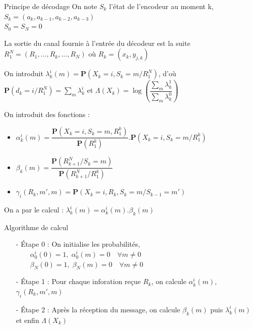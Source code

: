 \documentclass[11pt]{beamer}
\begin{document}
\begin{frame}{Principe de d\'ecodage}
	On note $S_k$ l'\'etat de l'encodeur au moment k, $S_k = (a_k, a_{k-1}, a_{k-2}, a_{k-3})$ \\
	$S_0 = S_N = 0$ \\ \smallskip

	La sortie du canal fournie \`a l'entr\'ee du d\'ecodeur est la suite $R_1^N = (R_1,\ldots,R_k,\ldots,R_N)$
	o\`u $R_k = (x_k,y_{j,k})$ \\ \smallskip
	
	On introduit $\lambda_k^i(m) = \mathbf{P}(X_k = i, S_k = m / R_1^N)$, d'o\`u $\mathbf{P}(d_k = i / R_1^N) = \sum\limits_{m} \lambda_k^i$ et $\Lambda(X_k) = \log\left(\dfrac{\sum\limits_{m} \lambda_k^1}{\sum\limits_{m} \lambda_k^0}\right) $
\end{frame}

\begin{frame}
	On introduit des fonctions :
	\begin{itemize}
		\item $\alpha_k^i(m) = \dfrac{\mathbf{P}(X_k = i, S_k = m, R_1^k)}{\mathbf{P}(R_1^k)}.\mathbf{P}(X_k = i, S_k = m / R_1^k)$
		\item $\beta_k(m) = \dfrac{\mathbf{P}(R_{k+1}^N / S_k = m)}{\mathbf{P}(R_{k+1}^N / R_1^k)}$
		\item $\gamma_i(R_k, m', m) = \mathbf{P}(X_k = i, R_k, S_k = m/ S_{k-1} = m')$
	\end{itemize}
	On a par le calcul : $\lambda_k^i(m) = \alpha_k^i(m).\beta_k(m)$
\end{frame}

\begin{frame}{Algorithme de calcul}
	\begin{itemize}
		\item[-] \'Etape 0 : On initialise les probabilit\'es, \\
					$\qquad \alpha_0^i(0) = 1, \; \alpha_0^i(m) = 0 \quad \forall m \neq 0$\\
					$\qquad \beta_N(0) = 1, \; \beta_N(m) = 0 \quad \forall m \neq 0$
		\item[-] \'Etape 1 : Pour chaque inforation re\c{c}ue $R_k$, on calcule $\alpha_k^i(m)$, $\gamma_i(R_k, m', m)$
		\item[-] \'Etape 2 : Apr\`es la r\'eception du message, on calcule  $\beta_k(m)$ puis  $\lambda_k^i(m)$ et enfin $\Lambda(X_k)$
	\end{itemize}
\end{frame}
\end{document}
